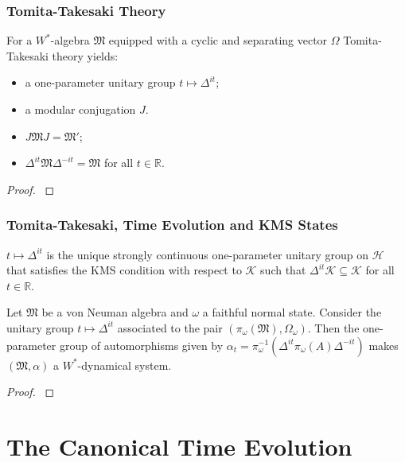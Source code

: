 \documentclass{beamer}
\begin{document}
\begin{frame}
	\frametitle{Tomita-Takesaki Theory}
	For a $W^*$-algebra $\mathfrak{M}$ equipped with a cyclic and separating vector $\Omega$ Tomita-Takesaki theory yields:
	\begin{itemize}
		\item a one-parameter unitary group $t\mapsto\Delta^{it}$;
		\item a modular conjugation $J$.
	\end{itemize}
	\begin{theorem}
		\begin{itemize}
			\item $J\mathfrak{M}J=\mathfrak{M}'$;
			\item $\Delta^{it}\mathfrak{M}\Delta^{-it}=\mathfrak{M}$ for all $t\in\mathbb{R}$. 	
		\end{itemize}
	\end{theorem}
	\begin{proof}
		\cite{Duvenhage1999}
	\end{proof}
\end{frame}

\begin{frame}
	\frametitle{Tomita-Takesaki, Time Evolution and KMS States}
	\begin{theorem}[$\bigstar$]
		$t\mapsto\Delta^{it}$ is the unique strongly continuous one-parameter unitary group on $\mathcal{H}$ that satisfies the KMS condition with respect to $\mathcal{K}$ such that $\Delta^{it}\mathcal{K}\subseteq\mathcal{K}$ for all $t\in\mathbb{R}$.
	\end{theorem}
	\begin{theorem}[$\bigstar$]
		Let $\mathfrak{M}$ be a von Neuman algebra and $\omega$ a faithful normal state. Consider the unitary group $t\mapsto\Delta^{it}$ associated to the pair $(\pi_\omega(\mathfrak{M}),\Omega_\omega)$. Then the one-parameter group of automorphisms given by $\alpha_t = \pi_\omega^{-1}(\Delta^{it}\pi_\omega(A)\Delta^{-it})$ makes $(\mathfrak{M},\alpha)$ a $W^*$-dynamical system.
	\end{theorem}
	\begin{proof}
		\cite{Duvenhage1999}
	\end{proof}
\end{frame}

\section{The Canonical Time Evolution}
\end{document}
